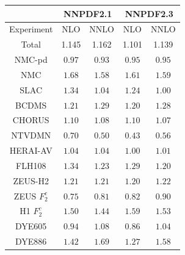 \documentclass[10pt]{beamer}
\begin{document}
\begin{frame}
\begin{columns}
\begin{column}{0.6\textwidth}
\begin{table}
\scriptsize
\begin{tabular}{|c||c|c||c|c|}
\hline 
& \multicolumn{2}{c||}{\bf NNPDF2.1} & \multicolumn{2}{|c|}{\bf NNPDF2.3}  \\
\hline 
\hline 
Experiment  & NLO & NNLO  & NLO  & NNLO  \\
\hline
Total  &   1.145&   1.162 &    1.101 &    1.139  \\  
 \hline 
NMC-pd              & $          0.97      $ & $          0.93      $  &  $          0.95      $  &  $          0.95      $    \\  
NMC                 & $          1.68      $ & $          1.58      $  &  $          1.61      $  &  $          1.59      $  \\  
SLAC                & $          1.34      $ & $          1.04      $  &  $          1.24      $  &  $          1.00      $   \\  
BCDMS               & $          1.21      $ & $          1.29      $  &  $          1.20      $  &  $          1.28      $    \\  
CHORUS              & $          1.10      $ & $          1.08      $  &  $          1.10      $  &  $          1.07      $    \\  
NTVDMN              & $          0.70      $ & $          0.50      $  &  $          0.43      $  &  $          0.56      $    \\  
 \hline
HERAI-AV            & $          1.04      $ & $          1.04      $  &  $          1.00      $  &  $          1.01      $   \\  
FLH108              & $          1.34      $ & $          1.23      $  &  $          1.29      $  &  $          1.20      $    \\  
ZEUS-H2             & $          1.21      $ & $          1.21      $  &  $          1.20      $  &  $          1.22      $    \\  
ZEUS $F_2^c$        & $          0.75      $ & $          0.81      $  &  $          0.82      $  &  $          0.90      $    \\  
H1 $F_2^c$          & $          1.50      $ & $          1.44      $  &  $          1.59      $  &  $          1.53      $   \\  
 \hline
DYE605              & $          0.94      $ & $          1.08      $  &  $          0.86      $  &  $          1.04      $    \\  
DYE886              & $          1.42      $ & $          1.69      $  &  $          1.27      $  &  $          1.58      $ \\  

\end{tabular}
\end{table}
\end{column}
\end{columns}
\end{frame}
\end{document}
